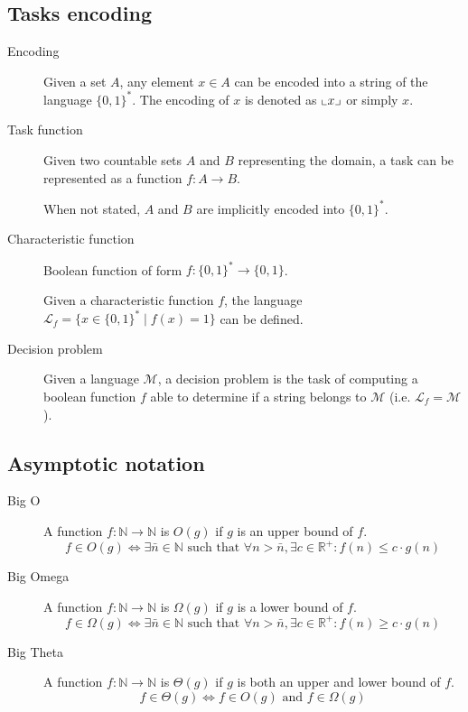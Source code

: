 \subsection{Tasks encoding}

\begin{description}
    \item[Encoding] 
        Given a set $A$, any element $x \in A$ can be encoded into a string of the language $\{0, 1\}^*$.
        The encoding of $x$ is denoted as ${\llcorner{x}\lrcorner}$ or simply $x$.

    \item[Task function] 
        Given two countable sets $A$ and $B$ representing the domain,
        a task can be represented as a function $f: A \rightarrow B$.

        When not stated, $A$ and $B$ are implicitly encoded into $\{0, 1\}^*$.

    \item[Characteristic function] 
        Boolean function of form $f: \{0, 1\}^* \rightarrow \{0, 1\}$.

        Given a characteristic function $f$, the language $\mathcal{L}_f = \{ x \in \{0, 1\}^* \mid f(x) = 1 \}$
        can be defined.

    \item[Decision problem] 
        Given a language $\mathcal{M}$, a decision problem is the task of computing a boolean function $f$ 
        able to determine if a string belongs to $\mathcal{M}$ (i.e. $\mathcal{L}_f = \mathcal{M}$).
\end{description}


\subsection{Asymptotic notation}

\begin{description}
    \item[Big O] 
        A function $f: \mathbb{N} \rightarrow \mathbb{N}$ is $O(g)$ if $g$ is an upper bound of $f$.
        \[ f \in O(g) \iff \exists \bar{n} \in \mathbb{N} \text{ such that } \forall n > \bar{n}, \exists c \in \mathbb{R}^+: f(n) \leq c \cdot g(n) \]
    
    \item[Big Omega] 
        A function $f: \mathbb{N} \rightarrow \mathbb{N}$ is $\Omega(g)$ if $g$ is a lower bound of $f$.
        \[ f \in \Omega(g) \iff \exists \bar{n} \in \mathbb{N} \text{ such that } \forall n > \bar{n}, \exists c \in \mathbb{R}^+: f(n) \geq c \cdot g(n) \]

    \item[Big Theta]
        A function $f: \mathbb{N} \rightarrow \mathbb{N}$ is $\Theta(g)$ if $g$ is both an upper and lower bound of $f$.
        \[ f \in \Theta(g) \iff f \in O(g) \text{ and } f \in \Omega(g) \]
    
\end{description}